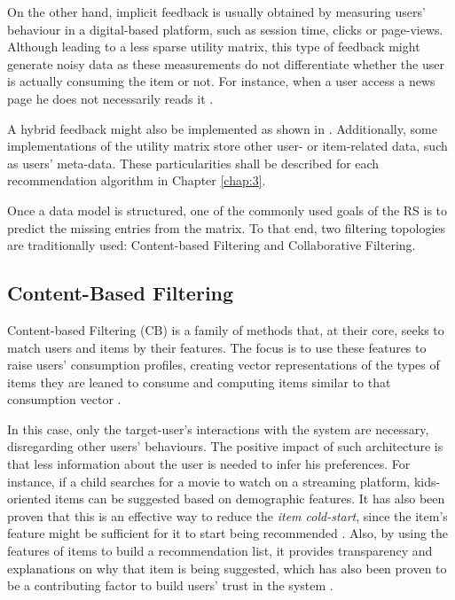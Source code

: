     On the other hand, implicit feedback is usually obtained by measuring users' behaviour in a digital-based platform, such as session time, clicks or page-views. Although leading to a less sparse utility matrix, this type of feedback might generate noisy data as these measurements do not differentiate whether the user is actually consuming the item or not. For instance, when a user access a news page he does not necessarily reads it \cite{2008ImplicitFeedback}.
    
    A hybrid feedback might also be implemented as shown in \cite{2015RSPrinciples}. Additionally, some implementations of the utility matrix store other user- or item-related data, such as users' meta-data. These particularities shall be described for each recommendation algorithm in Chapter \ref{chap:3}. 
    
    Once a data model is structured, one of the commonly used goals of the RS is to predict the missing entries from the matrix. To that end, two filtering topologies are traditionally used: Content-based Filtering and Collaborative Filtering. 

\subsection{Content-Based Filtering}

    Content-based Filtering (CB)  is a family of methods that, at their core, seeks to match users and items by their features. The focus is to use these features to raise users' consumption profiles, creating vector representations of the types of items they are leaned to consume and computing items similar to that consumption vector \cite{2016Textbook}.
    
    In this case, only the target-user's interactions with the system are necessary, disregarding other users' behaviours. The positive impact of such architecture is that less information about the user is needed to infer his preferences. For instance, if a child searches for a movie to watch on a streaming platform, kids-oriented items can be suggested based on demographic features. It has also been proven that this is an effective way to reduce the \textit{item cold-start}, since the item's feature might be sufficient for it to start being recommended \cite{10.1145/564376.564421}. Also, by using the features of items to build a recommendation list, it provides transparency and explanations on why that item is being suggested, which has also been proven to be a contributing factor to build users' trust in the system \cite{10.1145/1111449.1111475}.

